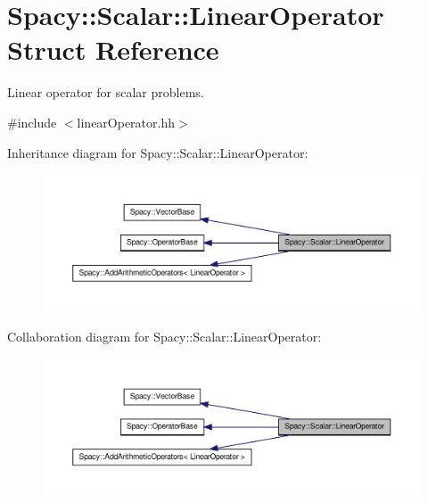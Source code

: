 \hypertarget{structSpacy_1_1Scalar_1_1LinearOperator}{\section{\-Spacy\-:\-:\-Scalar\-:\-:\-Linear\-Operator \-Struct \-Reference}
\label{structSpacy_1_1Scalar_1_1LinearOperator}
}


\-Linear operator for scalar problems.  




{\ttfamily \#include $<$linear\-Operator.\-hh$>$}



\-Inheritance diagram for \-Spacy\-:\-:\-Scalar\-:\-:\-Linear\-Operator\-:
\nopagebreak
\begin{figure}[H]
\begin{center}
\leavevmode
\includegraphics[width=350pt]{structSpacy_1_1Scalar_1_1LinearOperator__inherit__graph}
\end{center}
\end{figure}


\-Collaboration diagram for \-Spacy\-:\-:\-Scalar\-:\-:\-Linear\-Operator\-:
\nopagebreak
\begin{figure}[H]
\begin{center}
\leavevmode
\includegraphics[width=350pt]{structSpacy_1_1Scalar_1_1LinearOperator__coll__graph}
\end{center}
\end{figure}

